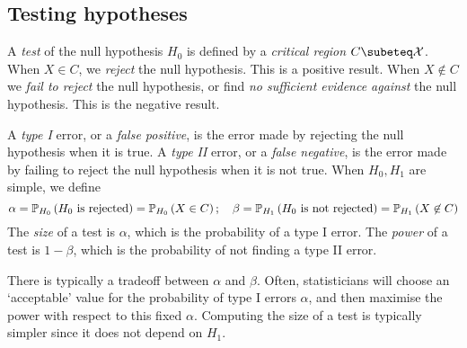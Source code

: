 \subsection{Testing hypotheses}
\begin{definition}
	A \textit{test} of the null hypothesis \( H_0 \) is defined by a \textit{critical region} \( C \subeteq \mathcal X \).
	When \( X \in C \), we \textit{reject} the null hypothesis.
	This is a positive result.
	When \( X \not\in C \) we \textit{fail to reject} the null hypothesis, or find \textit{no sufficient evidence against} the null hypothesis.
	This is the negative result.

	A \textit{type I} error, or a \textit{false positive}, is the error made by rejecting the null hypothesis when it is true.
	A \textit{type II} error, or a \textit{false negative}, is the error made by failing to reject the null hypothesis when it is not true.
	When \( H_0, H_1 \) are simple, we define
	\[ \alpha = \mathbb{P}_{H_0}\left({H_0 \text{ is rejected}}\right) = \mathbb{P}_{H_0}\left({X \in C}\right);\quad \beta = \mathbb{P}_{H_1}\left({H_0 \text{ is not rejected}}\right) = \mathbb{P}_{H_1}\left({X \not\in C}\right) \]
	The \textit{size} of a test is \( \alpha \), which is the probability of a type I error.
	The \textit{power} of a test is \( 1 - \beta \), which is the probability of not finding a type II error.

	There is typically a tradeoff between \( \alpha \) and \( \beta \).
	Often, statisticians will choose an `acceptable' value for the probability of type I errors \( \alpha \), and then maximise the power with respect to this fixed \( \alpha \).
	Computing the size of a test is typically simpler since it does not depend on \( H_1 \).
\end{definition}

